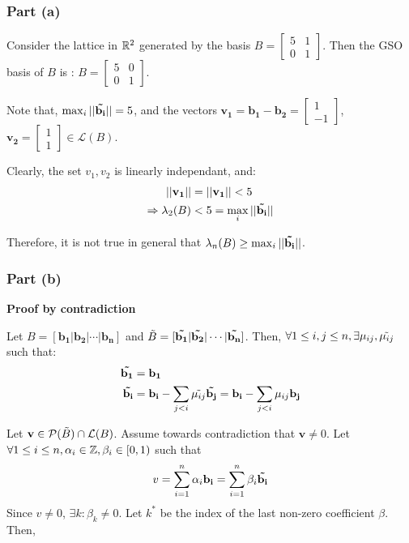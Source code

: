 \subsubsection*{Part (a)}
Consider the lattice in $\mathbb{R}^2$ generated by the basis $B = \begin{bmatrix}
    5 & 1 \\
    0 & 1
\end{bmatrix}$. Then the GSO basis of $B$ is : $B = \begin{bmatrix}
    5 & 0 \\
    0 & 1
\end{bmatrix}$.

Note that, $\max_i ||\mathbf{\Tilde{b_i}}|| = 5$, and the vectors $\mathbf{v_1} = \mathbf{b_1} - \mathbf{b_2} = \begin{bmatrix}
    1 \\
    -1
\end{bmatrix}$, $\mathbf{v_2} = \begin{bmatrix}
    1 \\
    1
\end{bmatrix} \in \mathcal{L}(B)$.

Clearly, the set ${v_1, v_2}$ is linearly independant, and:
\begin{align*}
    ||\mathbf{v_1}|| &= ||\mathbf{v_1}|| < 5 \\
    \Rightarrow \lambda_2(B) &< 5 = \max_i ||\mathbf{\Tilde{b_i}}||
\end{align*}

Therefore, it is not true in general that $\lambda_n(B) \ge \max_i ||\mathbf{\Tilde{b_i}}||$.

\subsubsection*{Part (b)}
\textbf{Proof by contradiction}

Let $B = [\mathbf{b_1} | \mathbf{b_2} | \cdots | \mathbf{b_n}]$ and $\Tilde{B} = [\mathbf{\Tilde{b_1}} | \mathbf{\Tilde{b_2}} | \cdots |  \mathbf{\Tilde{b_n}}]$. Then, $\forall 1 \le i,j \le n, \exists \mu_{ij}, \Tilde{\mu_{ij}}$ such that:
\begin{align*}
    \mathbf{\Tilde{b_1}} &= \mathbf{b_1} \\
    \mathbf{\Tilde{b_i}} &= \mathbf{b_i} - \sum_{j < i} \Tilde{\mu_{ij}} \mathbf{\Tilde{b_j}} = \mathbf{b_i} - \sum_{j < i} \mu_{ij}\mathbf{b_j}
\end{align*}

Let $\mathbf{v} \in \mathcal{P}(\Tilde{B}) \cap \mathcal{L}(B)$. Assume towards contradiction that $ \mathbf{v} \ne 0$. Let $\forall 1 \le i \le n, \alpha_i \in \mathbb{Z}, \beta_i \in [0,1)$ such that \[v = \sum_{i = 1}^n \alpha_i \mathbf{b_i} = \sum_{i = 1}^n \beta_i \mathbf{\Tilde{b_i}}\]
Since $v \ne 0$, $\exists k: \beta_k \ne 0$. Let $k^*$ be the index of the last non-zero coefficient $\beta$. Then,

